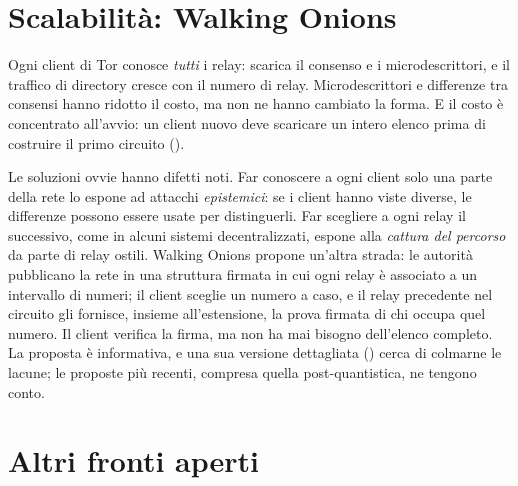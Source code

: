 \section{Scalabilità: Walking Onions}\label{sec:fut-walking}

Ogni client di Tor conosce \emph{tutti} i relay: scarica il consenso e i microdescrittori, e il traffico di directory cresce con il numero di relay. Microdescrittori e differenze tra consensi hanno ridotto il costo, ma non ne hanno cambiato la forma. E il costo è concentrato all'avvio: un client nuovo deve scaricare un intero elenco prima di costruire il primo circuito ().

Le soluzioni ovvie hanno difetti noti. Far conoscere a ogni client solo una parte della rete lo espone ad attacchi \emph{epistemici}: se i client hanno viste diverse, le differenze possono essere usate per distinguerli. Far scegliere a ogni relay il successivo, come in alcuni sistemi decentralizzati, espone alla \emph{cattura del percorso} da parte di relay ostili. Walking Onions propone un'altra strada: le autorità pubblicano la rete in una struttura firmata in cui ogni relay è associato a un intervallo di numeri; il client sceglie un numero a caso, e il relay precedente nel circuito gli fornisce, insieme all'estensione, la prova firmata di chi occupa quel numero. Il client verifica la firma, ma non ha mai bisogno dell'elenco completo. La proposta è informativa, e una sua versione dettagliata () cerca di colmarne le lacune; le proposte più recenti, compresa quella post-quantistica, ne tengono conto.

\section{Altri fronti aperti}\label{sec:fut-altri}

